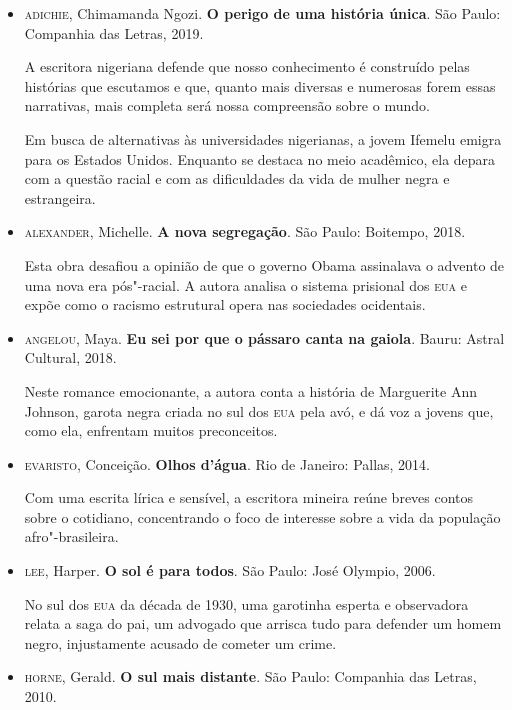 \documentclass[11pt]{extarticle}
\begin{document}
\begin{itemize}
\item\textsc{adichie}, Chimamanda Ngozi. \textbf{O perigo de uma história única}.
  São Paulo: Companhia das Letras, 2019.

A escritora nigeriana defende que nosso conhecimento é construído pelas
histórias que escutamos e que, quanto mais diversas e numerosas forem
essas narrativas, mais completa será nossa compreensão sobre o mundo.

Em busca de alternativas às universidades nigerianas, a jovem Ifemelu
emigra para os Estados Unidos. Enquanto se destaca no meio acadêmico,
ela depara com a questão racial e com as dificuldades da vida de mulher
negra e estrangeira.

\item\textsc{alexander}, Michelle. \textbf{A nova segregação}. São Paulo: Boitempo,
  2018.

Esta obra desafiou a opinião de que o governo Obama assinalava o advento
de uma nova era pós"-racial. A autora analisa o sistema prisional dos \textsc{eua}
e expõe como o racismo estrutural opera nas sociedades ocidentais.

\item\textsc{angelou}, Maya. \textbf{Eu sei por que o pássaro canta na gaiola}.
  Bauru: Astral Cultural, 2018.

Neste romance emocionante, a autora conta a história de Marguerite Ann
Johnson, garota negra criada no sul dos \textsc{eua} pela avó, e dá voz a jovens
que, como ela, enfrentam muitos preconceitos.

\item\textsc{evaristo}, Conceição. \textbf{Olhos d'água}. Rio de Janeiro: Pallas, 2014.

Com uma escrita lírica e sensível, a escritora mineira reúne breves
contos sobre o cotidiano, concentrando o foco de interesse sobre a vida
da população afro"-brasileira.

\item\textsc{lee}, Harper. \textbf{O sol é para todos}. São Paulo: José Olympio,
  2006.

No sul dos \textsc{eua} da década de 1930, uma garotinha esperta e observadora
relata a saga do pai, um advogado que arrisca tudo para defender um
homem negro, injustamente acusado de cometer um crime.

\item\textsc{horne}, Gerald. \textbf{O sul mais distante}. São Paulo: Companhia das
  Letras, 2010.


\end{itemize}
\end{document}
